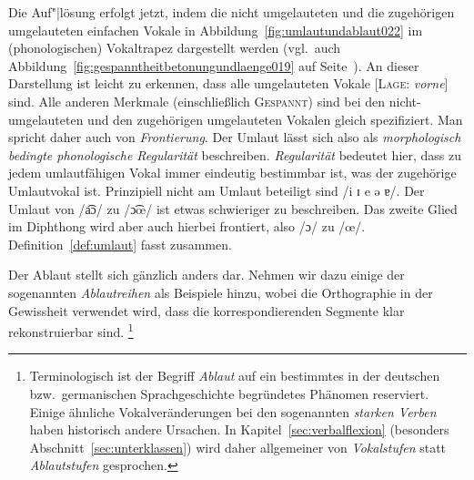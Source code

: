 Die Auf"|lösung erfolgt jetzt, indem die nicht umgelauteten und die zugehörigen umgelauteten einfachen Vokale in Abbildung~\ref{fig:umlautundablaut022} im (phonologischen) Vokaltrapez dargestellt werden (vgl.\ auch Abbildung~\ref{fig:gespanntheitbetonungundlaenge019} auf Seite~\pageref{fig:gespanntheitbetonungundlaenge019}).
An dieser Darstellung ist leicht zu erkennen, dass alle umgelauteten Vokale [\textsc{Lage}: \textit{vorne}] sind.
Alle anderen Merkmale (einschließlich \textsc{Gespannt}) sind bei den nicht-umge\-laute\-ten und den zugehörigen umgelauteten Vokalen gleich spezifiziert.
Man spricht daher auch von \textit{Frontierung}.
Der Umlaut lässt sich also als \textit{morphologisch bedingte phonologische Regularität} beschreiben.
\textit{Regularität} bedeutet hier, dass zu jedem umlautfähigen Vokal immer eindeutig bestimmbar ist, was der zugehörige Umlautvokal ist.
Prinzipiell nicht am Umlaut beteiligt sind /i ɪ e ə ɐ/.
Der Umlaut von /a͡ɔ/ zu /ɔ͡œ/ ist etwas schwieriger zu beschreiben.
Das zweite Glied im Diphthong wird aber auch hierbei frontiert, also /ɔ/ zu /œ/.
Definition~\ref{def:umlaut} fasst zusammen.



Der Ablaut stellt sich gänzlich anders dar.
Nehmen wir dazu einige der sogenannten \textit{Ablautreihen} als Beispiele hinzu, wobei die Orthographie in der Gewissheit verwendet wird, dass die korrespondierenden Segmente klar rekonstruierbar sind.%
\footnote{Terminologisch ist der Begriff \textit{Ablaut} auf ein bestimmtes in der deutschen bzw.\ germanischen Sprachgeschichte begründetes Phänomen reserviert.
Einige ähnliche Vokalveränderungen bei den sogenannten \textit{starken Verben} haben historisch andere Ursachen.
In Kapitel~\ref{sec:verbalflexion} (besonders Abschnitt~\ref{sec:unterklassen}) wird daher allgemeiner von \textit{Vokalstufen} statt \textit{Ablautstufen} gesprochen.}


\begin{exe}
  \ex\label{ex:umlautundablaut023}
  \begin{xlist}
  \end{xlist}
\end{exe}


